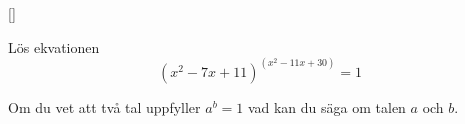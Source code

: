 [\mild]

Lös ekvationen $$(x^2-7x+11)^{(x^2-11x+30)}=1$$

\begin{rem}
    Om du vet att två tal uppfyller $a^b=1$ vad kan du säga om talen $a$ och $b$.
\end{rem}
